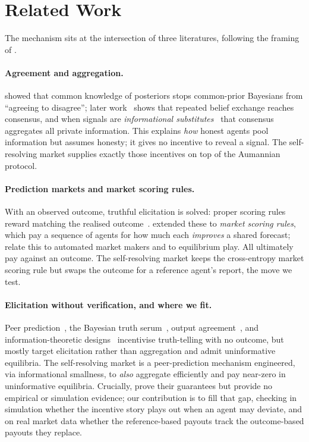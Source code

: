 \section{Related Work}
\label{sec:related}

The mechanism sits at the intersection of three literatures, following the framing of
\textcite{srinivasan2025selfresolving}.

\paragraph{Agreement and aggregation.}
\textcite{aumann1976agreeing} showed that common knowledge of posteriors stops common-prior
Bayesians from ``agreeing to disagree''; later work~\parencite{kong2022aggregation} shows
that repeated belief exchange reaches consensus, and when signals are \emph{informational
substitutes}~\parencite{chen2016informational} that consensus aggregates all private
information. This explains \emph{how} honest agents
pool information but assumes honesty; it gives no incentive to reveal a signal. The
self-resolving market supplies exactly those incentives on top of the Aumannian protocol.

\paragraph{Prediction markets and market scoring rules.}
With an observed outcome, truthful elicitation is solved: proper scoring rules reward
matching the realised outcome~\parencite{brier1950verification,good1952rational,gneiting2007strictly}.
\textcite{hanson2003combinatorial} extended these to \emph{market scoring rules}, which pay
a sequence of agents for how much each \emph{improves} a shared forecast;
\textcite{chen2012designing} relate this to automated market makers and
\textcite{chen2010gaming} to equilibrium play. All ultimately pay against an outcome. The
self-resolving market keeps the cross-entropy market scoring rule but swaps the outcome for
a reference agent's report, the move we test.

\paragraph{Elicitation without verification, and where we fit.}
Peer prediction~\parencite{miller2005eliciting}, the Bayesian truth
serum~\parencite{prelec2004bayesian}, output agreement~\parencite{waggoner2014output}, and
information-theoretic designs~\parencite{kong2019information} incentivise truth-telling with
no outcome, but mostly target elicitation rather than aggregation and admit uninformative
equilibria.
The self-resolving market is a peer-prediction mechanism engineered, via informational
smallness, to \emph{also} aggregate efficiently and pay near-zero in uninformative
equilibria. Crucially, \textcite{srinivasan2025selfresolving} prove their guarantees but
provide no empirical or simulation evidence; our contribution is to fill that gap,
checking in simulation whether the incentive story plays out when an agent may deviate,
and on real market data whether the reference-based payouts track the outcome-based payouts
they replace.
